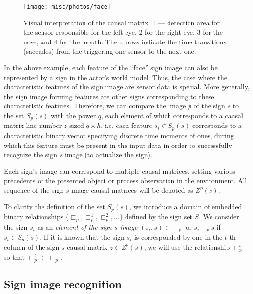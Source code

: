 \documentclass[12pt]{scrartcl}
\begin{document}
	\begin{figure}
		\label{fig:face}
		\centering
		\texttt{[image: misc/photos/face]}
		\caption{Visual interpretation of the causal matrix. 1 --- detection area for the sensor responsible for the left eye, 2 for the right eye, 3 for the nose, and 4 for the mouth. The arrows indicate the time transitions (saccades) from the triggering one sensor to the next one.}		
	\end{figure}
	
	In the above example, each feature of the ``face'' sign image can also be represented by a sign in the actor’s world model. Thus, the case where the characteristic features of the sign image are sensor data is special. More generally, the sign image forming features are other signs corresponding to these characteristic features. Therefore, we can compare the image $p$ of the sign $s$ to the set $S_p(s)$ with the power $q$, each element of which corresponds to a causal matrix line number $z$ sized $q\times h$, i.e. each feature $s_i\in S_p(s)$ corresponds to a characteristic binary vector specifying discrete time moments of ones, during which this feature must be present in the input data in order to successfully recognize the sign $s$ image (to actualize the sign).
	
	Each sign’s image can correspond to multiple causal matrices, setting various precedents of the presented object or process observation in the environment. All sequence of the sign $s$ image causal matrices will be denoted as $Z^p(s)$.
	
	To clarify the definition of the set $S_p(s)$, we introduce a domain of embedded binary relationships $\{\sqsubset_p,\sqsubset_p^1,\sqsubset_p^2,\dots\}$ defined by the sign set $S$. We consider the sign $s_i$ as an \textit{element of the sign $s$ image} $(s_i,s)\in\sqsubset_p$ or $s_i\sqsubset_p s$ if $s_i\in S_p(s)$. If it is known that the sign $s_i$ is corresponded by one in the $t$-th column of the sign $s$ causal matrix $z\in Z^p(s)$, we will use the relationship $\sqsubset_p^t$ so that $\sqsubset_p^t\subset \sqsubset_p$.
		
	\subsection{Sign image recognition }\label{subsec:actual}
	
\end{document}
